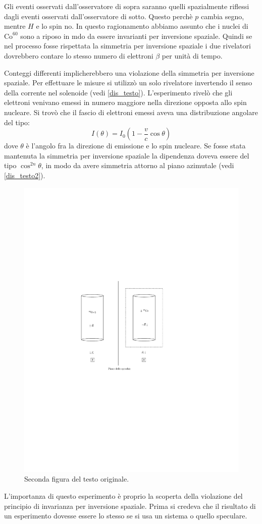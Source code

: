 Gli eventi osservati dall'osservatore di sopra saranno quelli spazialmente
riflessi dagli eventi osservati dall'osservatore di sotto. Questo perchè $p$ cambia segno,
mentre $H$ e lo spin no. In questo ragionamento abbiamo assunto che i nuclei di $\text{Co}^{60}$ sono a riposo in mdo da essere invarianti per inversione spaziale.
Quindi se nel processo fosse rispettata la simmetria per inversione spaziale i due rivelatori dovrebbero contare lo stesso numero di elettroni $\beta$ per unità di tempo.

Conteggi differenti implicherebbero una violazione della simmetria per inversione spaziale. Per effettuare le misure si utilizzò un solo rivelatore invertendo il senso della
corrente nel solenoide (vedi \autoref{dis_testo}). L'esperimento rivelò che gli elettroni venivano emessi in numero maggiore nella direzione opposta allo spin nucleare.
Si trovò che il fascio di elettroni emessi aveva una distribuzione angolare del tipo:
\[
I(\theta)=I_0(1-\frac{v}{c}\cos\theta)
\]
dove $\theta$ è l'angolo fra la direzione di emissione e lo spin nucleare.
Se fosse stata mantenuta la simmetria per inversione spaziale la dipendenza doveva essere del tipo $\cos^{2n}\theta$, in modo da avere simmetria attorno al piano azimutale
(vedi \autoref{dis_testo2}).
\begin{figure}[!hbt]
\centering
\caption{Seconda figura del testo originale.}
\label{dis_testo2}
\includegraphics{img/dis_pboh2}
\end{figure}
L'importanza di questo esperimento è proprio la scoperta della violazione del principio di invarianza per inversione spaziale. Prima si credeva che il risultato di un esperimento
dovesse essere lo stesso se si usa un sistema o quello speculare.

